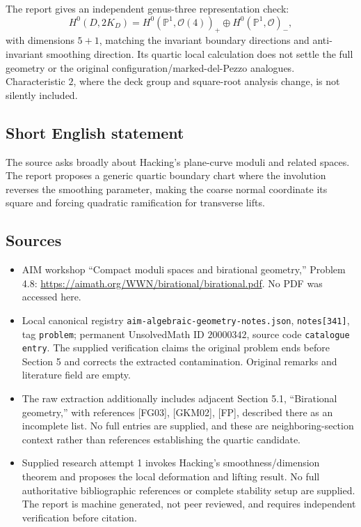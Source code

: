 \documentclass[11pt]{article}
\newcommand{\PP}{\mathbb{P}}
\begin{document}
The report gives an independent genus-three representation check:
\[
H^0(D,2K_D)
=H^0(\PP^1,\mathcal O(4))_+\oplus H^0(\PP^1,\mathcal O)_-,
\]
with dimensions \(5+1\), matching the invariant boundary directions and anti-invariant smoothing direction. Its quartic local calculation does not settle the full geometry or the original configuration/marked-del-Pezzo analogues. Characteristic \(2\), where the deck group and square-root analysis change, is not silently included.
\subsection{Short English statement}
The source asks broadly about Hacking's plane-curve moduli and related spaces. The report proposes a generic quartic boundary chart where the involution reverses the smoothing parameter, making the coarse normal coordinate its square and forcing quadratic ramification for transverse lifts.
\subsection{Sources}
\begin{itemize}
\item AIM workshop ``Compact moduli spaces and birational geometry,'' Problem 4.8: \url{https://aimath.org/WWN/birational/birational.pdf}. No PDF was accessed here.
\item Local canonical registry \texttt{aim-algebraic-geometry-notes.json}, \texttt{notes[341]}, tag \texttt{problem}; permanent UnsolvedMath ID \(20000342\), source code \texttt{catalogue entry}. The supplied verification claims the original problem ends before Section 5 and corrects the extracted contamination. Original remarks and literature field are empty.
\item The raw extraction additionally includes adjacent Section 5.1, ``Birational geometry,'' with references [FG03], [GKM02], [FP], described there as an incomplete list. No full entries are supplied, and these are neighboring-section context rather than references establishing the quartic candidate.
\item Supplied research attempt 1 invokes Hacking's smoothness/dimension theorem and proposes the local deformation and lifting result. No full authoritative bibliographic references or complete stability setup are supplied. The report is machine generated, not peer reviewed, and requires independent verification before citation.
\end{itemize}
\end{document}
